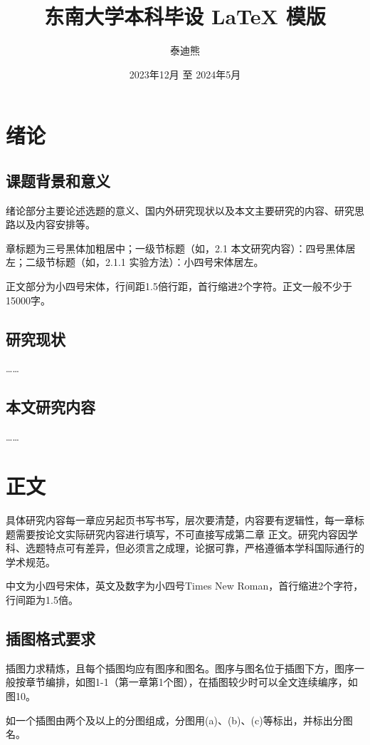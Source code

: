 \documentclass[fontset = mac ms]{seuthesis2024b}
\title{东南大学本科毕设 \LaTeX{} 模版}
\author{泰迪熊}
\date{2023年12月 至 2024年5月}
\begin{document}
  \maketitle

  \chapter{绪论}
    \section{课题背景和意义}
      绪论部分主要论述选题的意义、国内外研究现状以及本文主要研究的内容、研究思路以及内容安排等。

      章标题为三号黑体加粗居中；一级节标题（如，2.1 本文研究内容）：四号黑体居左；二级节标题（如，2.1.1 实验方法）：小四号宋体居左。

      正文部分为小四号宋体，行间距1.5倍行距，首行缩进2个字符。正文一般不少于15000字。

    \section{研究现状}
      ……

    \section{本文研究内容}
      ……

    \chapter{正文}

      具体研究内容每一章应另起页书写书写，层次要清楚，内容要有逻辑性，每一章标题需要按论文实际研究内容进行填写，不可直接写成第二章 正文。研究内容因学科、选题特点可有差异，但必须言之成理，论据可靠，严格遵循本学科国际通行的学术规范。

      中文为小四号宋体，英文及数字为小四号Times New Roman，首行缩进2个字符，行间距为1.5倍。

    \section{插图格式要求}

      插图力求精炼，且每个插图均应有图序和图名。图序与图名位于插图下方，图序一般按章节编排，如图1-1（第一章第1个图），在插图较少时可以全文连续编序，如图10。
      
      如一个插图由两个及以上的分图组成，分图用(a)、(b)、(c)等标出，并标出分图名。
\end{document}
